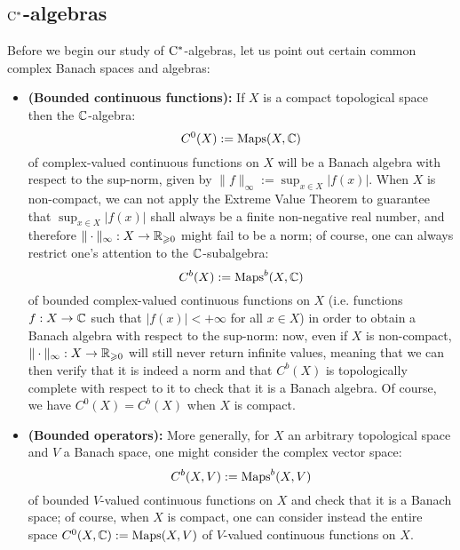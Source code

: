     \subsection{\texorpdfstring{$\mathrm{C}^*$}{}-algebras}
        \begin{example}
            Before we begin our study of $\mathrm{C}^*$-algebras, let us point out certain common complex Banach spaces and algebras:
            \begin{itemize}
                \item \textbf{(Bounded continuous functions):} If $X$ is a compact topological space then the $\mathbb{C}$-algebra:
                    $$C^0(X) := \mathrm{Maps}(X, \mathbb{C})$$
                of complex-valued continuous functions on $X$ will be a Banach algebra with respect to the sup-norm, given by $\|f\|_{\infty} := \sup_{x \in X} |f(x)|$. When $X$ is non-compact, we can not apply the Extreme Value Theorem to guarantee that $\sup_{x \in X} |f(x)|$ shall always be a finite non-negative real number, and therefore $\|\cdot\|_{\infty}: X \to \mathbb{R}_{\geqslant 0}$ might fail to be a norm; of course, one can always restrict one's attention to the $\mathbb{C}$-subalgebra:
                    $$C^b(X) := \mathrm{Maps}^b(X, \mathbb{C})$$
                of bounded complex-valued continuous functions on $X$ (i.e. functions $f: X \to \mathbb{C}$ such that $|f(x)| < +\infty$ for all $x \in X$) in order to obtain a Banach algebra with respect to the sup-norm: now, even if $X$ is non-compact, $\|\cdot\|_{\infty}: X \to \mathbb{R}_{\geqslant 0}$ will still never return infinite values, meaning that we can then verify that it is indeed a norm and that $C^b(X)$ is topologically complete with respect to it to check that it is a Banach algebra. Of course, we have $C^0(X) = C^b(X)$ when $X$ is compact. 
                \item \textbf{(Bounded operators):} More generally, for $X$ an arbitrary topological space and $V$ a Banach space, one might consider the complex vector space:
                    $$C^b(X, V) := \mathrm{Maps}^b(X, V)$$
                of bounded $V$-valued continuous functions on $X$ and check that it is a Banach space; of course, when $X$ is compact, one can consider instead the entire space $C^0(X, \mathbb{C}) := \mathrm{Maps}(X, V)$ of $V$-valued continuous functions on $X$.
                

\end{itemize}
\end{example}
